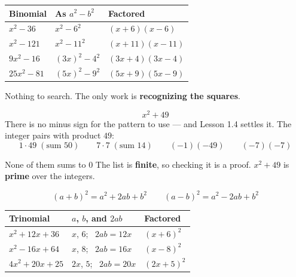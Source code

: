 \documentclass[aspectratio=169, 11pt]{beamer}
\begin{document}
\begin{frame}[t, plain]
  \vspace{0.2cm}
  \renewcommand{\arraystretch}{1.5}
  \begin{tabularx}{\textwidth}{@{}p{3.0cm} p{4.2cm} X@{}}
    \textbf{Binomial} & \textbf{As $a^2-b^2$} & \textbf{Factored} \\
    \hline
    $x^2-36$    & $x^2-6^2$      & $(x+6)(x-6)$ \\
    $x^2-121$   & $x^2-11^2$     & $(x+11)(x-11)$ \\
    $9x^2-16$   & $(3x)^2-4^2$   & $(3x+4)(3x-4)$ \\
    $25x^2-81$  & $(5x)^2-9^2$   & $(5x+9)(5x-9)$ \\
  \end{tabularx}
  \vspace{0.3cm}

  Nothing to search. The only work is \textbf{recognizing the squares}.
\end{frame}

\begin{frame}[t, plain]
  \[ x^2+49 \]
  There is no minus sign for the pattern to use --- and Lesson 1.4 settles it. The integer pairs
  with product $49$:
  \[ 1 \cdot 49 \;(\text{sum } 50) \qquad 7 \cdot 7 \;(\text{sum } 14) \qquad
     (-1)(-49) \qquad (-7)(-7) \]
  \begin{block}{None of them sums to $0$}
    The list is \textbf{finite}, so checking it is a proof. $x^2+49$ is \textbf{prime} over the
    integers.
  \end{block}
\end{frame}

\begin{frame}[t, plain]
  \[ (a+b)^2 = a^2+2ab+b^2 \qquad (a-b)^2 = a^2-2ab+b^2 \]
  \vspace{0.1cm}
  \renewcommand{\arraystretch}{1.5}
  \begin{tabularx}{\textwidth}{@{}p{3.2cm} p{4.6cm} X@{}}
    \textbf{Trinomial} & \textbf{$a$, $b$, and $2ab$} & \textbf{Factored} \\
    \hline
    $x^2+12x+36$  & $x$, $6$; \ $2ab=12x$ & $(x+6)^2$ \\
    $x^2-16x+64$  & $x$, $8$; \ $2ab=16x$ & $(x-8)^2$ \\
    $4x^2+20x+25$ & $2x$, $5$; \ $2ab=20x$ & $(2x+5)^2$ \\
  \end{tabularx}
\end{frame}
\end{document}
